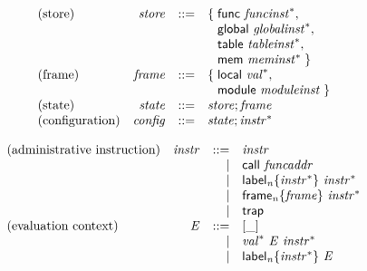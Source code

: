 \vspace{1ex}

$$
\begin{array}{@{}lrrl@{}l@{}}
\mbox{(store)} & {\mathit{store}} &::=& \{\; \begin{array}[t]{@{}l@{}l@{}}
\mathsf{func}~{{\mathit{funcinst}}^\ast},\; \\
  \mathsf{global}~{{\mathit{globalinst}}^\ast},\; \\
  \mathsf{table}~{{\mathit{tableinst}}^\ast},\; \\
  \mathsf{mem}~{{\mathit{meminst}}^\ast} \;\}\end{array} \\
\mbox{(frame)} & {\mathit{frame}} &::=& \{\; \begin{array}[t]{@{}l@{}l@{}}
\mathsf{local}~{{\mathit{val}}^\ast},\; \\
  \mathsf{module}~{\mathit{moduleinst}} \;\}\end{array} \\
\mbox{(state)} & {\mathit{state}} &::=& {\mathit{store}} ; {\mathit{frame}} \\
\mbox{(configuration)} & {\mathit{config}} &::=& {\mathit{state}} ; {{\mathit{instr}}^\ast} \\
\end{array}
$$

\vspace{1ex}

$$
\begin{array}{@{}lrrl@{}l@{}}
\mbox{(administrative instruction)} & {\mathit{instr}} &::=& {\mathit{instr}} \\ &&|&
\mathsf{call}~{\mathit{funcaddr}} \\ &&|&
{{\mathsf{label}}_{{\mathit{n}}}}{\{{{\mathit{instr}}^\ast}\}}~{{\mathit{instr}}^\ast} \\ &&|&
{{\mathsf{frame}}_{{\mathit{n}}}}{\{{\mathit{frame}}\}}~{{\mathit{instr}}^\ast} \\ &&|&
\mathsf{trap} \\
\mbox{(evaluation context)} & {\mathit{E}} &::=& [\mathsf{\_}] \\ &&|&
{{\mathit{val}}^\ast}~{\mathit{E}}~{{\mathit{instr}}^\ast} \\ &&|&
{{\mathsf{label}}_{{\mathit{n}}}}{\{{{\mathit{instr}}^\ast}\}}~{\mathit{E}} \\
\end{array}
$$

\vspace{1ex}

